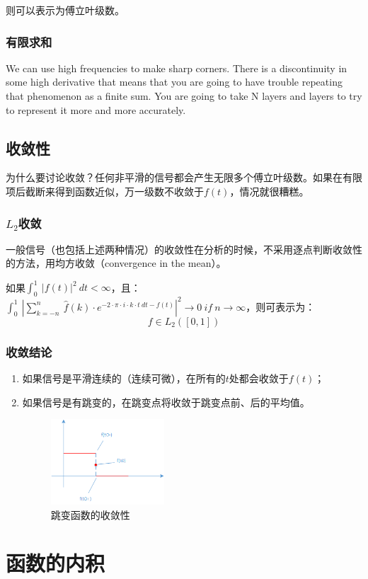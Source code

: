 则可以表示为傅立叶级数。
\subsubsection{有限求和}
We can use high frequencies to make sharp corners. There is a discontinuity in some high derivative that means that you are going to have trouble repeating that phenomenon as a finite sum. You are going to take N layers and layers to try to represent it more and more accurately.
\subsection{收敛性}
为什么要讨论收敛？任何非平滑的信号都会产生无限多个傅立叶级数。如果在有限项后截断来得到函数近似，万一级数不收敛于$f(t)$，情况就很糟糕。
\subsubsection{$L_2$收敛}
一般信号（也包括上述两种情况）的收敛性在分析的时候，不采用逐点判断收敛性的方法，用均方收敛（convergence in the mean）。

如果$\int_{0}^{1}\ |f(t)|^2\ dt<\infty$，且：$\int_{0}^{1}\ |\sum\limits_{k=-n}^{n}\ \hat{f}(k)\cdot e^{-2\cdot \pi\cdot i\cdot k\cdot t\ dt-f(t)}|^2\rightarrow 0\ if\ n\rightarrow \infty$，则可表示为：
$$
	f\in L_2([0,1])
$$
\subsubsection{收敛结论}
\begin{enumerate}
	\item 如果信号是平滑连续的（连续可微），在所有的$t$处都会收敛于$f(t)$；
	\item 如果信号是有跳变的，在跳变点将收敛于跳变点前、后的平均值。
	      \begin{figure}[H]
		      \centering
		      \includegraphics[width=0.4\textwidth]{assets/convergence.png}
		      \caption{跳变函数的收敛性}
	      \end{figure}
\end{enumerate}
\section{函数的内积}
